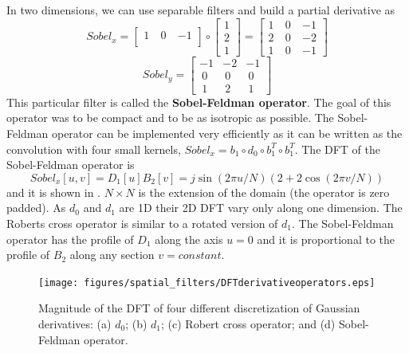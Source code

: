 In two dimensions, we can use separable filters and build a partial derivative as
\begin{equation}
Sobel_x =  \begin{bmatrix}
  1 ~& 0 ~& -1 \\
\end{bmatrix}\circ \begin{bmatrix}
  1 \\
  2 \\
  1
\end{bmatrix}=
\begin{bmatrix}
  1 ~& 0 ~& -1 \\
  2 ~& 0 ~& -2\\
  1~&  0 ~& -1
\end{bmatrix}
\end{equation}
\begin{equation}
Sobel_y =  \begin{bmatrix}
  -1 & -2 & -1 \\
 ~0 & ~0 & ~0\\
  ~1&  ~2 & ~1
\end{bmatrix}
\label{eq:sobel_kernels}
\end{equation}
This particular filter is called the {\bf Sobel-Feldman operator}. 
The goal of this operator was to be compact and to be as isotropic as possible. The Sobel-Feldman operator can be implemented very efficiently as it can be written as the convolution with four small kernels, $Sobel_x=b_1 \circ d_0 \circ b_1^T \circ b_1^T$.
The DFT of the Sobel-Feldman operator is
\begin{equation}
Sobel_x \left[u,v \right] = D_1\left[u\right] B_2 \left[v \right] = j \sin \left( 2 \pi u /N \right) \left( 2+2 \cos \left(2 \pi v/N \right) \right)
\end{equation}
and it is shown in . $N \times N$ is the extension of the domain (the operator is zero padded). As $d_0$ and $d_1$ are 1D their 2D DFT vary only along one dimension. The Roberts cross operator is similar to a rotated version of $d_1$. The Sobel-Feldman operator has the profile of $D_1$ along the axis $u=0$ and it is proportional to the profile of $B_2$ along any section $v=constant$.

\begin{figure}[t]
\centerline{
\texttt{[image: figures/spatial\_filters/DFTderivativeoperators.eps]}}
\caption{Magnitude of the DFT of four different discretization of Gaussian derivatives: (a) $d_0$; (b) $d_1$; (c) Robert cross operator; and (d) Sobel-Feldman operator.  
} 
\label{fig:DFTderivativeoperators}
\end{figure}

